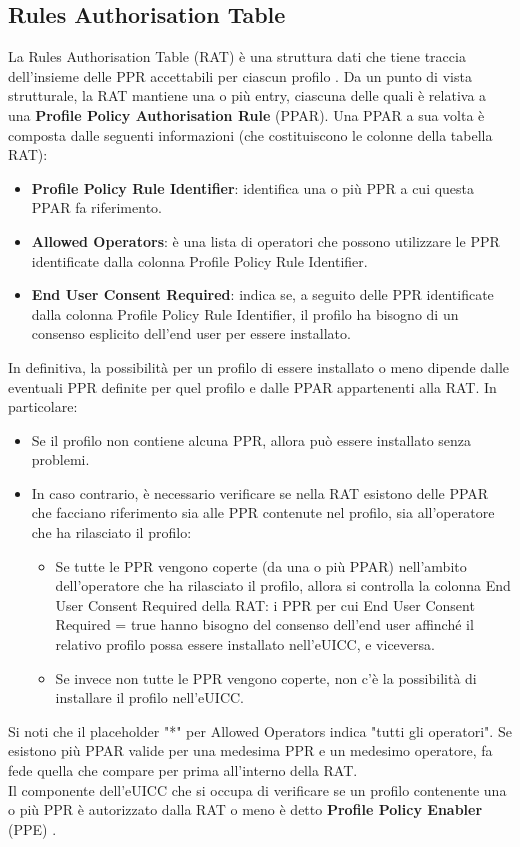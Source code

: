 \documentclass[10pt, oneside]{book}
\begin{document}
\subsection{Rules Authorisation Table}
La Rules Authorisation Table (RAT) è una struttura dati che tiene traccia dell'insieme delle PPR accettabili per ciascun profilo \cite{GSMA-docs-new}. Da un punto di vista strutturale, la RAT mantiene una o più entry, ciascuna delle quali è relativa a una \textbf{Profile Policy Authorisation Rule} (PPAR). Una PPAR a sua volta è composta dalle seguenti informazioni (che costituiscono le colonne della tabella RAT):
\begin{itemize}
\item \textbf{Profile Policy Rule Identifier}: identifica una o più PPR a cui questa PPAR fa riferimento.
\item \textbf{Allowed Operators}: è una lista di operatori che possono utilizzare le PPR identificate dalla colonna Profile Policy Rule Identifier.
\item \textbf{End User Consent Required}: indica se, a seguito delle PPR identificate dalla colonna Profile Policy Rule Identifier, il profilo ha bisogno di un consenso esplicito dell'end user per essere installato.
\end{itemize}
In definitiva, la possibilità per un profilo di essere installato o meno dipende dalle eventuali PPR definite per quel profilo e dalle PPAR appartenenti alla RAT. In particolare:
\begin{itemize}
\item Se il profilo non contiene alcuna PPR, allora può essere installato senza problemi.
\item In caso contrario, è necessario verificare se nella RAT esistono delle PPAR che facciano riferimento sia alle PPR contenute nel profilo, sia all'operatore che ha rilasciato il profilo:
\begin{itemize}[itemsep=0pt]
\item Se tutte le PPR vengono coperte (da una o più PPAR) nell'ambito dell'operatore che ha rilasciato il profilo, allora si controlla la colonna End User Consent Required della RAT: i PPR per cui End User Consent Required = true hanno bisogno del consenso dell'end user affinché il relativo profilo possa essere installato nell'eUICC, e viceversa.
\item Se invece non tutte le PPR vengono coperte, non c'è la possibilità di installare il profilo nell'eUICC.
\end{itemize}
\end{itemize}
Si noti che il placeholder "*" per Allowed Operators indica "tutti gli operatori". Se esistono più PPAR valide per una medesima PPR e un medesimo operatore, fa fede quella che compare per prima all'interno della RAT.\\
Il componente dell'eUICC che si occupa di verificare se un profilo contenente una o più PPR è autorizzato dalla RAT o meno è detto \textbf{Profile Policy Enabler} (PPE) \cite{GSMA-docs-new}.
\end{document}

